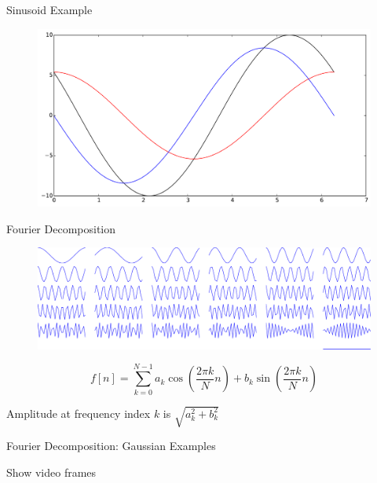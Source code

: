\documentclass{beamer}
\begin{document}
\begin{frame}{Sinusoid Example}

\begin{figure}[t]
    \includegraphics[width=\textwidth]{SineDecomp3.pdf}
\end{figure}

\end{frame}

\begin{frame}{Fourier Decomposition}

\begin{figure}[t]
    \includegraphics[width=\textwidth]{FourierBasis.pdf}
\end{figure}

\[ f[n] = \sum_{k = 0}^{N-1} a_k \cos \left( \frac{2\pi k}{N} n \right) + b_k \sin \left( \frac{2\pi k}{N} n \right) \]

Amplitude at frequency index $k$ is $\sqrt{a_k^2 + b_k^2}$

\end{frame}



\begin{frame}{Fourier Decomposition: Gaussian Examples}

Show video frames

\end{frame}
\end{document}
